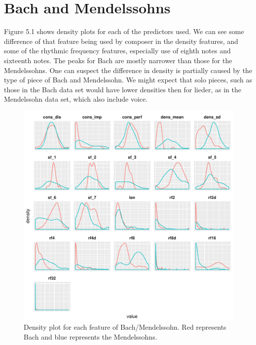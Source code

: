 \documentclass[12pt,twoside]{reedthesis}
\theoremstyle{definition}
\theoremstyle{definition}
\theoremstyle{definition}
\theoremstyle{remark}
\begin{document}
\section{Bach and Mendelssohns}\label{bach-and-mendelssohns}

Figure 5.1 shows density plots for each of the predictors used. We can
see some difference of that feature being used by composer in the
density features, and some of the rhythmic frequency features,
especially use of eighth notes and sixteenth notes. The peaks for Bach
are mostly narrower than those for the Mendelssohns. One can suspect the
difference in density is partially caused by the type of piece of Bach
and Mendelssohn. We might expect that solo pieces, such as those in the
Bach data set would have lower densities then for lieder, as in the
Mendelssohn data set, which also include voice.
\begin{figure}[H]
\centering
\includegraphics[scale = .7]{images/distribution_b.pdf}
\caption{Density plot for each feature of Bach/Mendelssohn. Red represents Bach and blue represents the Mendelssohns.}
\label{subd}
\end{figure}
\end{document}
